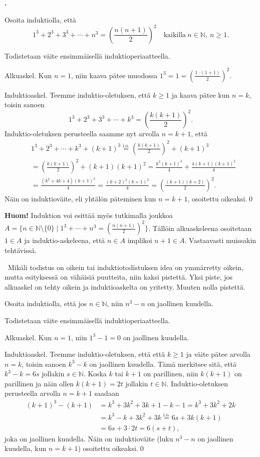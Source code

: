 \documentclass[11pt,a4paper,oneside,notitlepage,final]{article}
\newcommand{\N}{\mathbb{N}}
\newcounter{harjnro}
\newenvironment{harjlist}
  {\begin{list}{\kor{\arabic{harjnro}.}}
    {\usecounter{harjnro}
      \setlength{\labelwidth}{0em}
      \setlength{\labelsep}{0.4em}
      \setlength{\leftmargin}{0pt}
      \setlength{\parsep}{5pt}
      \setlength{\itemindent}{0.4em}
      \setlength{\topsep}{0.5\parskip}
      \setlength{\itemsep}{0.75\parskip}
    }
  }
  {\end{list}}
\newcommand{\kor}[1]{\textbf{#1}}
\begin{document}
\begin{harjlist}

\item[1.] Osoita induktiolla, että 
\[
1^3+2^3+3^3+\cdots+n^3=\left(\frac{n(n+1)}{2}\right)^2\quad\text{kaikilla}\ n\in\N,\ n\geqslant 1.
\]

\vspace{0.4cm}
\ratkaisu
Todistetaan väite ensimmäisellä induktioperiaatteella.

Alkuaskel. Kun $n=1$, niin kaava pätee muodossa $\displaystyle 1^3=1=\left(\frac{1\cdot(1+1)}{2}\right)^2$.

Induktioaskel. Teemme induktio-oletuksen, että $k\ge 1$ ja kaava pätee kun $n=k$, toisin sanoen
\[
1^3+2^3+3^3+\cdots+k^3=\left(\frac{k(k+1)}{2}\right)^2.
\]
Induktio-oletuksen perusteella saamme nyt arvolla $n=k+1$, että
\begin{align*}
&1^3+2^3+\cdots+k^3+(k+1)^3\overset{\text{i.o.}}{=}\left(\frac{k(k+1)}{2}\right)^2+(k+1)^3\\
&=\left(\frac{k(k+1)}{2}\right)^2+(k+1)(k+1)^2=\frac{k^2(k+1)^2}{4}+\frac{4(k+1)(k+1)^2}{4}\\
&=\frac{(k^2+4k+4)(k+1)^2}{4}=\frac{(k+2)^2(k+1)^2}{4}=\left(\frac{(k+1)(k+2)}{2}\right)^2.
\end{align*}
Näin on induktioväite, eli yhtälön päteminen kun $n=k+1$, osoitettu oikeaksi.\qed

\textbf{Huom!} Induktion voi esittää myös tutkimalla joukkoa $A=\{n\in \N\setminus\{0\} \mid 1^3+\cdots+n^3=(\frac{n(n+1)}{2})^2\}$. Tällöin alkuaskeleena osoitetaan $1\in A$ 
ja induktio-askeleena, että $n\in A$ implikoi $n+1\in A$.  Vastaavasti muissakin tehtävissä.

\arvostelu \
Mikäli todistus on oikein tai induktiotodistuksen idea on ymmärretty oikein, mutta esityksessä on
vähäisiä puutteita, niin kaksi pistettä. Yksi piste, jos alkuaskel on tehty oikein ja 
induktioaskelta on yritetty. Muuten nolla pistettä.

\item[2.] Osoita induktiolla, että jos $n\in\N$, niin $n^3-n$ on jaollinen kuudella.

\vspace{0.4cm}
\ratkaisu
Todistetaan väite ensimmäisellä induktioperiaatteella.

Alkuaskel. Kun $n=1$, niin $1^3-1=0$ on jaollinen kuudella. 

Induktioaskel. Teemme induktio-oletuksen, että että $k\ge 1$ ja väite pätee arvolla $n=k$, toisin 
sanoen $k^3-k$ on jaollinen kuudella. Tämä merkitsee sitä, että $k^3-k=6s$ jollakin $s\in\N$.
Koska $k$ tai $k+1$ on parillinen, niin $k(k+1)$ on parillinen ja näin ollen $k(k+1)=2t$ 
jollakin $t\in\N$. Induktio-oletuksen perusteella arvolla $n=k+1$ saadaan
\begin{align*}
(k+1)^3-(k+1)&=k^3+3k^2+3k+1-k-1=k^3+3k^2+2k\\
&=k^3-k+3k^2+3k\overset{\text{i.o.}}{=}6s+3k(k+1)\\
&=6s+3\cdot 2t=6(s+t),
\end{align*}
joka on jaollinen kuudella. Näin on induktioväite (luku $n^3-n$ on jaollinen kuudella, kun $n=k+1$) 
osoitettu oikeaksi.\qed


\end{harjlist}
\end{document}
